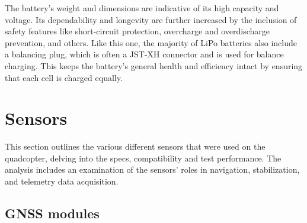 \documentclass{report}
\begin{document}
The battery's weight and dimensions are indicative of its high capacity and
voltage. Its dependability and longevity are further increased by the inclusion
of safety features like short-circuit protection, overcharge and overdischarge
prevention, and others. Like this one, the majority of LiPo batteries also
include a balancing plug, which is often a JST-XH connector and is used for
balance charging. This keeps the battery's general health and efficiency intact
by ensuring that each cell is charged equally.

\section{Sensors}
This section outlines the various different sensors that were used on the
quadcopter, delving into the specs, compatibility and test performance. The
analysis includes an examination of the sensors' roles in navigation,
stabilization, and telemetry data acquisition.

\subsection*{GNSS modules}
\end{document}
